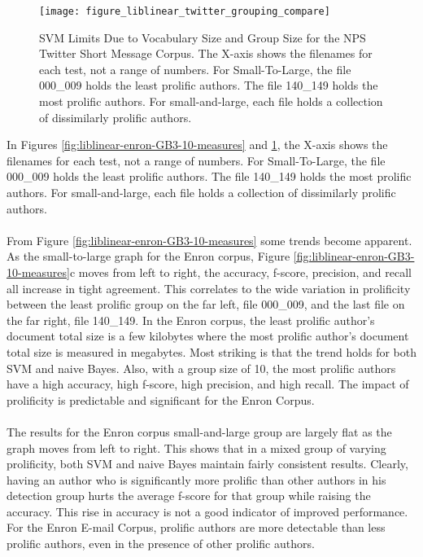 \begin{figure}[htbp!]
	\begin{center}
	\centering
	\texttt{[image: figure\_liblinear\_twitter\_grouping\_compare]}
	\caption{SVM Limits Due to Vocabulary Size and Group Size for the NPS Twitter Short Message Corpus. The X-axis shows the filenames for each test, not a range of numbers.  For Small-To-Large, the file 000\_009 holds the least prolific authors.  The file 140\_149 holds the most prolific authors.  For small-and-large, each file holds a collection of dissimilarly prolific authors.}
	\label{fig:liblinear-twitter-GB3-10-measures}
	\end{center}
\end{figure}
	
	
	In Figures \ref{fig:liblinear-enron-GB3-10-measures} and \ref{fig:liblinear-twitter-GB3-10-measures}, the X-axis shows the filenames for each test, not a range of numbers.  For Small-To-Large, the file 000\_009 holds the least prolific authors.  The file 140\_149 holds the most prolific authors.  For small-and-large, each file holds a collection of dissimilarly prolific authors.
	\paragraph*{} From Figure \ref{fig:liblinear-enron-GB3-10-measures} some trends become apparent.  As the small-to-large graph for the Enron corpus, Figure \ref{fig:liblinear-enron-GB3-10-measures}c moves from left to right, the accuracy, f-score, precision, and recall all increase in tight agreement.  This correlates to the wide variation in prolificity between the least prolific group on the far left, file 000\_009, and the last file on the far right, file 140\_149.  In the Enron corpus, the least prolific author's document total size is a few kilobytes where the most prolific author's document total size is measured in megabytes.  Most striking is that the trend holds for both SVM and naive Bayes.  Also, with a group size of 10, the most prolific authors have a high accuracy, high f-score, high precision, and high recall.  The impact of prolificity is predictable and significant for the Enron Corpus.
	\paragraph*{} The results for the Enron corpus small-and-large group are largely flat as the graph moves from left to right.  This shows that in a mixed group of varying prolificity, both SVM and naive Bayes maintain fairly consistent results.  Clearly, having an author who is significantly more prolific than other authors in his detection group hurts the average f-score for that group while raising the accuracy.  This rise in accuracy is not a good indicator of improved performance.  For the Enron E-mail Corpus, prolific authors are more detectable than less prolific authors, even in the presence of other prolific authors.
	

